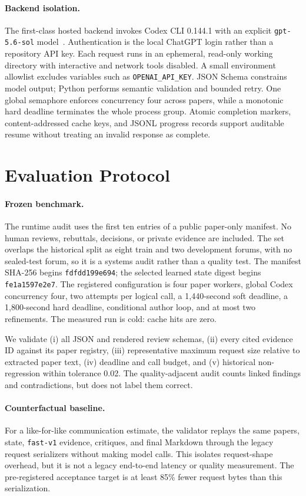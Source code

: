 \documentclass{article}
\begin{document}
\paragraph{Backend isolation.}
The first-class hosted backend invokes Codex CLI 0.144.1 with an explicit
\texttt{gpt-5.6-sol} model~\cite{openaigpt56sol}. Authentication is the local
ChatGPT login rather than a repository API key. Each request runs in an
ephemeral, read-only working directory with interactive and network tools
disabled. A small environment allowlist excludes variables such as
\texttt{OPENAI\_API\_KEY}. JSON Schema constrains model output; Python performs
semantic validation and bounded retry. One global semaphore enforces
concurrency four across papers, while a monotonic hard deadline terminates the
whole process group. Atomic completion markers, content-addressed cache keys,
and JSONL progress records support auditable resume without treating an invalid
response as complete.

\section{Evaluation Protocol}

\paragraph{Frozen benchmark.}
The runtime audit uses the first ten entries of a public paper-only manifest.
No human reviews, rebuttals, decisions, or private evidence are included. The
set overlaps the historical split as eight train and two development forums,
with no sealed-test forum, so it is a systems audit rather than a quality test.
The
manifest SHA-256 begins \texttt{fdfdd199e694}; the selected learned state digest
begins \texttt{fe1a1597e2e7}. The registered configuration is four paper
workers, global Codex concurrency four, two attempts per logical call, a
1,440-second soft deadline, a 1,800-second hard deadline, conditional author
loop, and at most two refinements. The measured run is cold: cache hits are
zero.

We validate (i) all JSON and rendered review schemas, (ii) every cited evidence
ID against its paper registry, (iii) representative maximum request size
relative to extracted paper text, (iv) deadline and call budget, and (v)
historical non-regression within tolerance 0.02. The quality-adjacent audit
counts linked findings and contradictions, but does not label them correct.

\paragraph{Counterfactual baseline.}
For a like-for-like communication estimate, the validator replays the same
papers, state, \texttt{fast-v1} evidence, critiques, and final Markdown through
the legacy request serializers without making model calls. This isolates
request-shape overhead, but it is not a legacy end-to-end latency or quality
measurement. The pre-registered acceptance target is at least 85\% fewer
request bytes than this serialization.
\end{document}
